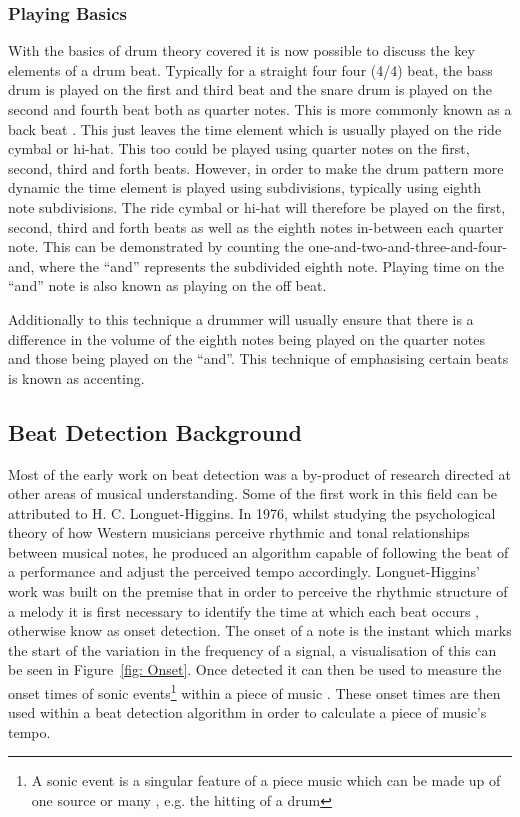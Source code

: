 \documentclass[a4paper, 11pt]{article}
\begin{document}
\subsubsection{Playing Basics}
With the basics of drum theory covered it is now possible to discuss the key elements of a drum beat. Typically for a straight four four (4/4) beat, the bass drum is played on the first and third beat and the snare drum is played on the second and fourth beat both as quarter notes. This is more commonly known as a back beat \cite{drum-bible}. This just leaves the time element which is usually played on the ride cymbal or hi-hat. This too could be played using quarter notes on the first, second, third and forth beats. However, in order to make the drum pattern more dynamic the time element is played using subdivisions, typically using eighth note subdivisions. The ride cymbal or hi-hat will therefore be played on the first, second, third and forth beats as well as the eighth notes in-between each quarter note. This can be demonstrated by counting the one-and-two-and-three-and-four-and, where the ``and'' represents the subdivided eighth note. Playing time on the ``and'' note is also known as playing on the off beat. \par

Additionally to this technique a drummer will usually ensure that there is a difference in the volume of the eighth notes being played on the quarter notes and those being played on the ``and''. This technique of emphasising certain beats is known as accenting. 


\subsection{Beat Detection Background}
Most of the early work on beat detection was a by-product of research directed at other areas of musical understanding. Some of the first work in this field can be attributed to H. C. Longuet-Higgins. In 1976, whilst studying the psychological theory of how Western musicians perceive rhythmic and tonal relationships between musical notes, he produced an algorithm capable of following the beat of a performance and adjust the perceived tempo accordingly\cite{allen-danneburg}. Longuet-Higgins' work was built on the premise that in order to perceive the rhythmic structure of a melody it is first necessary to identify the time at which each beat occurs \cite{longeut1}, otherwise know as onset detection. The onset of a note is the instant which marks the start of the variation in the frequency of a signal, a visualisation of this can be seen in Figure~\ref{fig: Onset}. Once detected it can then be used to measure the onset times of sonic events\footnote{A sonic event is a singular feature of a piece music which can be made up of one source or many \cite{sonic}, e.g. the hitting of a drum} within a piece of music \cite{mirex-onset}. These onset times are then used within a beat detection algorithm in order to calculate a piece of music's tempo. 
\end{document}
